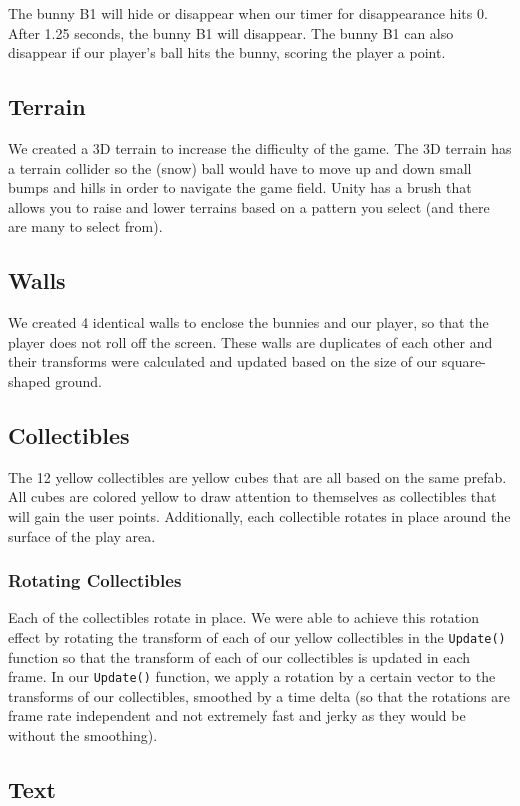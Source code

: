 \documentclass[12pt]{article}
\begin{document}
The bunny B1 will hide or disappear when our timer for disappearance hits 0. After 1.25 seconds, the bunny B1 will disappear. The bunny B1 can also disappear if our player's ball hits the bunny, scoring the player a point. 


\subsection{Terrain}
We created a 3D terrain to increase the difficulty of the game. The 3D terrain has a terrain collider so the (snow) ball would have to move up and down small bumps and hills in order to navigate the game field. Unity has a brush that allows you to raise and lower terrains based on a pattern you select (and there are many to select from). 

\subsection{Walls}
  We created 4 identical walls to enclose the bunnies and our player, so that the player does not roll off the screen. These walls are duplicates of each other and their transforms were calculated and updated based on the size of our square-shaped ground.

\subsection{Collectibles}
  The 12 yellow collectibles are yellow cubes that are all based on the same prefab. All cubes are colored yellow to draw attention to themselves as collectibles that will gain the user points. Additionally, each collectible rotates in place around the surface of the play area.

\subsubsection{Rotating Collectibles}
  Each of the collectibles rotate in place. We were able to achieve this rotation effect by rotating the transform of each of our yellow collectibles in the \verb+Update()+ function so that the transform of each of our collectibles is updated in each frame. In our \verb+Update()+ function, we apply a rotation by a certain vector to the transforms of our collectibles, smoothed by a time delta (so that the rotations are frame rate independent and not extremely fast and jerky as they would be without the smoothing).

\subsection{Text}
\end{document}
